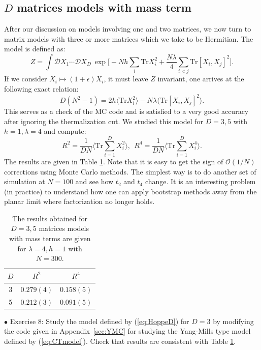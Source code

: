 \documentclass[letter,11pt]{article}
\begin{document}
\subsection{\label{subsec:ext_Hoppe}$D$ matrices models with mass term}
After our discussion on models involving one and two matrices, we now turn to matrix models 
with three or more matrices which we take to be Hermitian. The model is defined as:
\begin{equation}
\label{eq:HoppeD} 
	Z = \int \mathcal{D}X_1 \cdots \mathcal{D}X_D ~
	\exp\Big[ -Nh\sum_{i}\mbox{Tr}X_{i}^{2} + \frac{N\lambda}{4} \sum_{i < j} \mbox{Tr} [X_i,X_j]^{2}\Big]. 
\end{equation}
If we consider $X_i \mapsto (1+\epsilon) X_i$, it must leave $Z$ invariant, one arrives at the following exact relation: 
\begin{equation}
	D(N^2 -1) = 2 h \langle \mbox{Tr}X_{i}^{2} \rangle 
	- N \lambda \langle \mbox{Tr}[X_i,X_j]^{2} \rangle. 
\end{equation}
This serves as a check of the MC code and is satisfied to a very good accuracy
after ignoring the thermalization cut. We studied this model for $D=3,5$ with 
$h=1, \lambda=4$ and compute: 
\begin{equation}
\label{eq:R2R4} 
	R^2  =   \frac{1}{DN} \Bigg \langle \mbox{Tr} \sum_{i=1}^{D} X_{i}^2 \bigg \rangle, 
	~~ R^4  =   \frac{1}{DN} \Bigg \langle \mbox{Tr} \sum_{i=1}^{D} X_{i}^4 \bigg \rangle.  
\end{equation}
The results are given in Table \ref{table:D_YMM_data}. Note that it is easy to get the sign of $\mathcal{O}(1/N)$ corrections using Monte Carlo methods. The simplest way is to do another set of simulation at $N = 100$ and see how $t_{2}$ and 
$t_{4}$ change. It is an interesting problem (in practice) 
to understand how one can apply bootstrap methods away from the planar limit where factorization no longer holds.

\begin{table}[h!]
	\centering
	\begin{tabular}{||c c c||} 
		\hline
		$D$ & $ R^2$ & $R^4$ \\ [0.5ex] 
		\hline\hline
		3 & $ 0.279(4) $ & $ 0.158(5) $  \\ 
		5 & $ 0.212(3) $ & $ 0.091(5) $
		 \\ [1ex] 
		\hline 
	\end{tabular}
\caption{The results obtained for $D = 3,5$ matrices models with mass terms are given for $\lambda=4, h=1$ with $N=300$.}
\label{table:D_YMM_data}
\end{table}
\begin{mdframed}[backgroundcolor=blue!3] 
	$\bullet$ Exercise 8: Study the model defined by (\ref{eq:HoppeD}) for $D=3$ by modifying the code given in Appendix~\ref{sec:YMC} for studying the Yang-Mills type model defined by (\ref{eq:CTmodel}). Check that results are consistent with Table \ref{table:D_YMM_data}.  
\end{mdframed}
\end{document}
